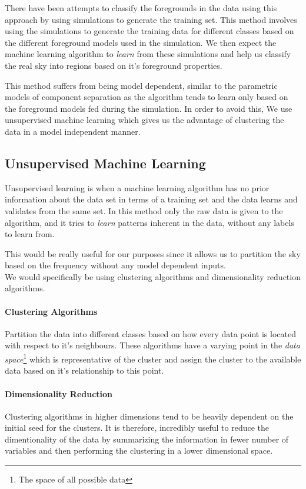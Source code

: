 There have been attempts \cite{fgremovalsupervised} to classify 
the foregrounds in the
data using this approach by using simulations to generate the training set. This method involves using the simulations to
generate the training data for different classes based on the different foreground models used in the simulation. We then expect the machine
learning algorithm to \emph{learn} from these simulations and help us classify the real sky into regions based on it's foreground properties.

This method suffers from being model dependent, similar to the parametric models of component separation
as the algorithm tends to learn only based on the foreground models fed during the
simulation. In order to avoid this, We use unsupervised machine learning which gives us the advantage of clustering the data in a model
independent manner.


\subsection{Unsupervised Machine Learning}
Unsupervised learning is when a machine learning algorithm has no prior information about the data set in terms of a training set and
the data learns and validates from the same set. In this method only the raw data is given to the algorithm, and it tries to \emph{learn}
patterns inherent in the data, without any labels to learn from.

This would be really useful for our purposes since it allows us to partition the sky based on the frequency without any model
dependent inputs.
\\
We would specifically be using clustering algorithms and dimensionality reduction algorithms.
\paragraph{Clustering Algorithms} Partition the data into different classes based on how every data point
is located with respect to it's neighbours. These algorithms have a varying point in the
\emph{data space}\footnote{The space of all possible data} which is representative of the cluster and
assign the cluster to the available data based on it's relationship to this point. 

\paragraph{Dimensionality Reduction}
Clustering algorithms in higher dimensions tend to be heavily dependent on the initial seed for the
clusters. It is therefore, incredibly useful to reduce the dimentionality of the data by summarizing the
information in fewer number of variables and then performing the clustering in a lower dimensional space.

